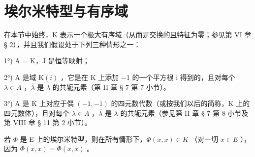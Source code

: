 \section{埃尔米特型与有序域}

在本节中始终，K 表示一个极大有序域（从而是交换的且特征为零；参见第 VI 章 § 2），并且我们假设处于下列三种情形之一：

1°) A = K，J 是恒等映射；

2°) A 是域 \(\mathrm{K}(i)\) ，它是在 K 上添加 −1 的一个平方根 i 得到的，且对每个 \(\lambda \in A\) ，\(\overline{\lambda}\) 是 \(\lambda\) 的共轭元素（第 II 章 § 7 第 7 小节）。

3°) A 是 K 上对应于偶 \((-1,-1)\) 的四元数代数（或按我们以后的简称，K 上的四元数体），且对每个 \(\lambda\in A\) ，\(\overline{\lambda}\) 是 \(\lambda\) 的共轭元素（参见第 II 章 § 7 第 8 小节及第 VIII 章 § 11 第 2 小节）。

若 \(\Phi\) 是 E 上的埃尔米特型，则在所有情形下，\(\Phi(x, x) \in K\) （对一切 \(x \in E\) ），因为 \(\Phi(x, x) = \overline{\Phi(x, x)}\) 。

